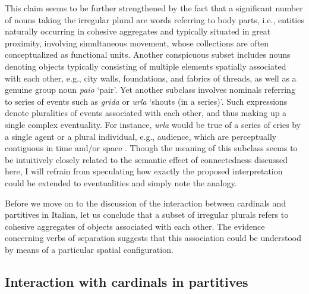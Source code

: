 This claim seems to be further strengthened by the fact that a significant number of nouns taking the irregular plural are words referring to body parts, i.e., entities naturally occurring in cohesive aggregates and typically situated in great proximity, involving simultaneous movement, whose collections are often conceptualized as functional units. Another conspicuous subset includes nouns denoting objects typically consisting of multiple elements spatially associated with each other, e.g., city walls, foundations, and fabrics of threads, as well as a genuine group noun \textit{paio} `pair'. Yet another subclass involves nominals referring to series of events such as \textit{grida} or \textit{urla} `shouts (in a series)'. Such expressions denote pluralities of events associated with each other, and thus making up a single complex eventuality. For instance, \textit{urla} would be true of a series of cries by a single agent or a plural individual, e.g., audience, which are perceptually contiguous in time and/or space \citep[pp. 149--150]{acquaviva2008lexical}. Though the meaning of this subclass seems to be intuitively closely related to the semantic effect of connectedness discussed here, I will refrain from speculating how exactly the proposed interpretation could be extended to eventualities and simply note the analogy.

Before we move on to the discussion of the interaction between cardinals and partitives in Italian, let us conclude that a subset of irregular plurals refers to cohesive aggregates of objects associated with each other. The evidence concerning verbs of separation suggests that this association could be understood by means of a particular spatial configuration.

\subsection{Interaction with cardinals in partitives}\label{sec:interaction-with-cardinals-in-partitives}


